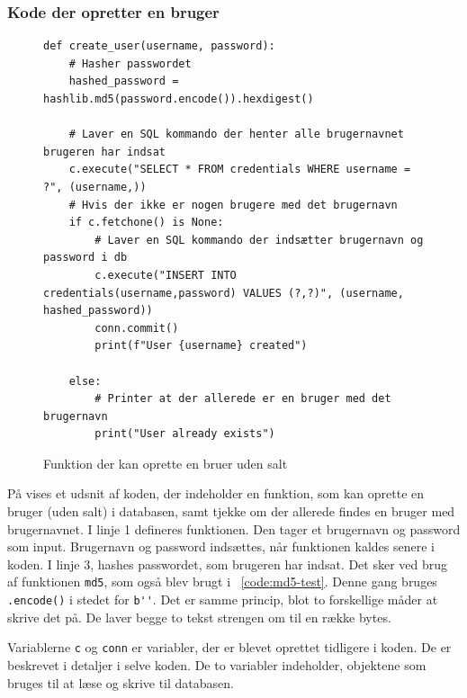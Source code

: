\documentclass[12pt]{article}
\begin{document}
\subsubsection{Kode der opretter en bruger}

\begin{figure}[ht]
\begin{verbatim}
def create_user(username, password):
    # Hasher passwordet
    hashed_password = hashlib.md5(password.encode()).hexdigest()

    # Laver en SQL kommando der henter alle brugernavnet brugeren har indsat
    c.execute("SELECT * FROM credentials WHERE username = ?", (username,))
    # Hvis der ikke er nogen brugere med det brugernavn
    if c.fetchone() is None:  
        # Laver en SQL kommando der indsætter brugernavn og password i db
        c.execute("INSERT INTO credentials(username,password) VALUES (?,?)", (username, hashed_password))
        conn.commit()
        print(f"User {username} created")

    else:  
        # Printer at der allerede er en bruger med det brugernavn
        print("User already exists")
\end{verbatim}
\caption{Funktion der kan oprette en bruer uden salt}
\label{code:create-user-wo-salt}
\end{figure}


På \figureautorefname{~\ref{code:create-user-wo-salt}} vises et udsnit af koden, der indeholder en funktion, som kan oprette en bruger (uden salt) i databasen, samt tjekke om der allerede findes en bruger med brugernavnet. I linje 1 defineres funktionen. Den tager et brugernavn og password som input. Brugernavn og password indsættes, når funktionen kaldes senere i koden. I linje 3, hashes passwordet, som brugeren har indsat. Det sker ved brug af funktionen \verb|md5|, som også blev brugt i \figurename{~\ref{code:md5-test}}. Denne gang bruges \verb|.encode()| i stedet for \verb|b''|. Det er samme princip, blot to forskellige måder at skrive det på. De laver begge to tekst strengen om til en række bytes. 

Variablerne \verb|c| og \verb|conn| er variabler, der er blevet oprettet tidligere i koden. De er beskrevet i detaljer i selve koden. De to variabler indeholder, objektene som bruges til at læse og skrive til databasen. 
\end{document}
